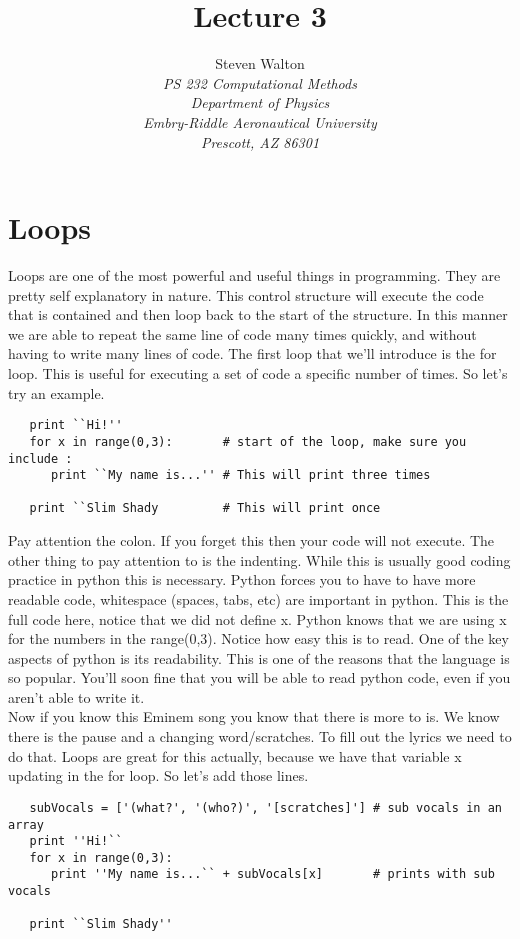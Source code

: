 \documentclass[11pt]{article}   %
\title{Lecture 3}
\author{Steven Walton\\     %
\textit{PS 232 Computational Methods}\\
\textit{Department of Physics}\\
\textit{Embry-Riddle Aeronautical University}\\
\textit{Prescott, AZ   86301}}
\begin{document}
\maketitle

\section*{Loops}
Loops are one of the most powerful and useful things in programming.  They are pretty self explanatory in nature.  This control structure will execute the code that is contained and then
loop back to the start of the structure.  In this manner we are able to repeat the same line of code many times quickly, and without having to write many lines of code.  The first
loop that we'll introduce is the for loop.  This is useful for executing a set of code a specific number of times.  So let's try an example.
\begin{tcolorbox}
   \begin{lstlisting}
   print ``Hi!''
   for x in range(0,3):       # start of the loop, make sure you include :
      print ``My name is...'' # This will print three times

   print ``Slim Shady         # This will print once
   \end{lstlisting}
\end{tcolorbox}
Pay attention the colon.  If you forget this then your code will not execute.  The other thing to pay attention to is the indenting.  While this is usually good coding practice in
python this is necessary.  Python forces you to have to have more readable code, whitespace (spaces, tabs, etc) are important in python.  This is the full code here, notice that we 
did not define x.  Python knows that we are using x for the numbers in the range(0,3).  Notice how easy this is to read.  One of the key aspects of python is its readability.  This
is one of the reasons that the language is so popular.  You'll soon fine that you will be able to read python code, even if you aren't able to write it.
\\
Now if you know this Eminem song you know that there is more to is.  We know there is the pause and a changing word/scratches.  To fill out the lyrics we need to do that.  Loops are great
for this actually, because we have that variable x updating in the for loop.  So let's add those lines.
\begin{tcolorbox}
   \begin{lstlisting}
   subVocals = ['(what?', '(who?)', '[scratches]'] # sub vocals in an array
   print ''Hi!``
   for x in range(0,3):
      print ''My name is...`` + subVocals[x]       # prints with sub vocals

   print ``Slim Shady''
   \end{lstlisting}
\end{tcolorbox}
\end{document}
